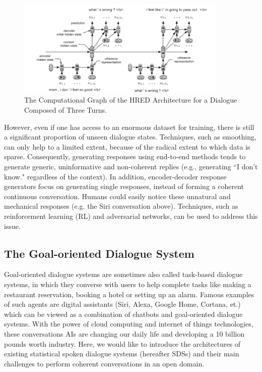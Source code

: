 \documentclass[bsc,frontabs,twoside,singlespacing,parskip,deptreport]{infthesis}     %
\begin{document}
\begin{figure}[h]
    \centering
    \includegraphics[width=0.9\textwidth]{HERD.jpeg}
    \caption{The Computational Graph of the HRED Architecture for a Dialogue Composed of Three Turns.}
    \label{fig:HERD}
\end{figure}

However, even if one has access to an enormous dataset for training, there is still a significant proportion of unseen dialogue states. Techniques, such as smoothing, can only help to a limited extent, because of the radical extent to which data is sparse. Consequently, generating responses using end-to-end methods tends to generate generic, uninformative and non-coherent replies (e.g., generating ``I don’t know." regardless of the context). In addition, encoder-decoder response generators focus on generating single responses, instead of forming a coherent continuous conversation\cite{jurafsky2019speech}. Humans could easily notice these unnatural and mechanical responses (e.g. the Siri conversation above). Techniques, such as reinforcement learning (RL)\cite{li2016deep} and adversarial networks\cite{li2017adversarial}, can be used to address this issue.

\subsection{The Goal-oriented Dialogue System}

 Goal-oriented dialogue systems are sometimes also called task-based dialogue systems, in which they converse with users to help complete tasks like making a restaurant reservation, booking a hotel or setting up an alarm. Famous examples of such agents are digital assistants (Siri, Alexa, Google Home, Cortana, et.)\cite{siri,alexa,googlehome,cortana} which can be viewed as a combination of chatbots and goal-oriented dialogue systems. With the power of cloud computing and internet of things technologies, these conversations AIs are changing our daily life and developing a 10 billion pounds worth industry\cite{chatbotmarket}. Here, we would like to introduce the architectures of existing statistical spoken dialogue systems (hereafter SDSs) and their main challenges to perform coherent conversations in an open domain. 
\end{document}
